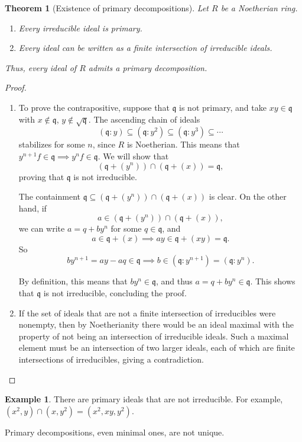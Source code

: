 \documentclass{amsart}[12pt]
\newcommand{\q}{{\mathfrak q}}
\numberwithin{equation}{section}
\theoremstyle{plain} %
\newtheorem{theorem}[equation]{Theorem}
\theoremstyle{definition}
\newtheorem{ex}[equation]{Example}
\theoremstyle{remark}
\begin{document}
\begin{theorem}[Existence of primary decompositions]
Let $R$ be a Noetherian ring.
\begin{enumerate}
\item Every irreducible ideal is primary.
\item Every ideal can be written as a finite intersection of irreducible ideals.
\end{enumerate}
Thus, every ideal of $R$ admits a primary decomposition.
\end{theorem}
\begin{proof}
\begin{enumerate}
\item To prove the contrapositive, suppose that $\q$ is not primary, and take $xy\in \q$ with $x\notin \q$, $y\notin \sqrt{\q}$. The ascending chain of ideals 
	$$(\q : y) \subseteq (\q : y^2) \subseteq (\q : y^3) \subseteq \cdots$$
	stabilizes for some $n$, since $R$ is Noetherian. This means that $y^{n+1} f\in \q \implies y^n f\in \q$. We will show that 
	$${(\q+(y^n))\cap( \q+(x)) = \q},$$ 
	proving that $\q$ is not irreducible.
	
	The containment $\q\subseteq (\q+(y^n))\cap( \q+(x))$ is clear. On the other hand, if 
	$$a \in (\q+(y^n))\cap( \q+(x)),$$ 
	we can write $a=q+by^n$ for some $q\in \q$, and 
	$$a\in \q + (x) \implies ay \in \q + (xy) = \q.$$
	So
	$$b y^{n+1} = ay - aq \in \q \implies b \in (\q : y^{n+1}) = (\q : y^n).$$
	
	By definition, this means that $by^n \in \q$, and thus $a = q+by^n \in \q$. This shows that $\q$ is not irreducible, concluding the proof. 
	
	\item  If the set of ideals that are not a finite intersection of irreducibles were nonempty, then by Noetherianity there would be an ideal maximal with the property of not being an intersection of irreducible ideals. Such a maximal element must be an intersection of two larger ideals, each of which are finite intersections of irreducibles, giving a contradiction. \qedhere
\end{enumerate}
\end{proof}

\begin{ex}
There are primary ideals that are not irreducible. For example, $(x^2,y) \cap (x,y^2) = (x^2,xy,y^2)$.
\end{ex}


Primary decompositions, even minimal ones, are not unique.
\end{document}
